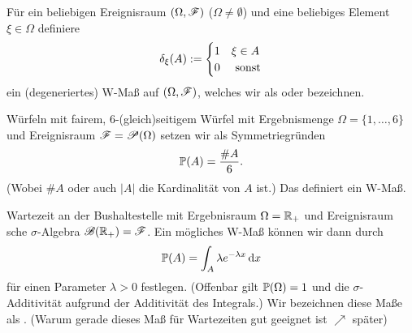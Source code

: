\begin{example}
	Für ein beliebigen Ereignisraum $(\Omega, \mathscr{F})$ ($\Omega \neq \emptyset$) und eine beliebiges Element $\xi \in \Omega$ definiere
	\begin{align}
		\delta_{\xi}(A) := \begin{cases}
		1 & \xi \in A \\
		0 & \text{ sonst}
		\end{cases}\notag
	\end{align}
	ein (degeneriertes) W-Maß auf $(\Omega, \mathscr{F})$, welches wir als  oder  bezeichnen.
\end{example}

\begin{example}
	Würfeln mit fairem, $6$-(gleich)seitigem Würfel mit Ergebnismenge $\Omega=\{1, \dots, 6\}$ und Ereignisraum $\mathscr{F} = \mathscr{P}(\Omega)$ setzen wir als Symmetriegründen
	\begin{align}
		\mathbb{P}(A) = \frac{\# A}{6}.\notag
	\end{align}
	(Wobei $\# A$ oder auch $\vert A \vert$ die Kardinalität von $A$ ist.) Das definiert ein W-Maß.
\end{example}

\begin{example}
	Wartezeit an der Bushaltestelle mit Ergebnisraum $\Omega = \mathbb{R}_{+}$ und Ereignisraum sche $\sigma$-Algebra $\mathscr{B}(\mathbb{R}_{+}) = \mathscr{F}$. Ein mögliches W-Maß können wir dann durch
	\begin{align}
	\probp(A) = \int_{A} \lambda e^{-\lambda x} \diff x\notag %
	\end{align}
	für einen Parameter $\lambda > 0$ festlegen. (Offenbar gilt $\mathbb{P}(\Omega) = 1$ und die $\sigma$-Additivität aufgrund der Additivität des Integrals.) Wir bezeichnen diese Maße als . (Warum gerade dieses Maß für Wartezeiten gut geeignet ist $\nearrow$ später) %
\end{example}


